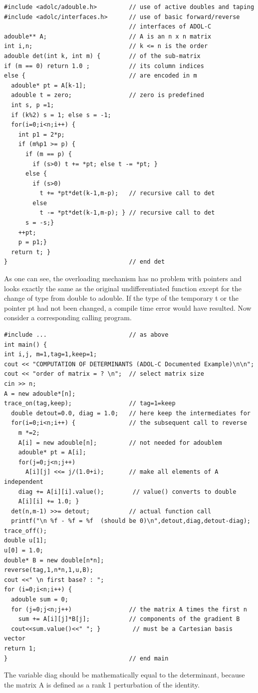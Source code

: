 \documentclass[11pt,twoside]{article}
\begin{document}
\begin{verbatim}
#include <adolc/adouble.h>         // use of active doubles and taping
#include <adolc/interfaces.h>      // use of basic forward/reverse
                                   // interfaces of ADOL-C
adouble** A;                       // A is an n x n matrix
int i,n;                           // k <= n is the order
adouble det(int k, int m) {        // of the sub-matrix
if (m == 0) return 1.0 ;           // its column indices
else {                             // are encoded in m
  adouble* pt = A[k-1];
  adouble t = zero;                // zero is predefined
  int s, p =1;
  if (k%2) s = 1; else s = -1;
  for(i=0;i<n;i++) {
    int p1 = 2*p;
    if (m%p1 >= p) {
      if (m == p) {
        if (s>0) t += *pt; else t -= *pt; }
      else {
        if (s>0)
          t += *pt*det(k-1,m-p);   // recursive call to det
        else
          t -= *pt*det(k-1,m-p); } // recursive call to det
      s = -s;}
    ++pt;
    p = p1;}
  return t; }
}                                  // end det
\end{verbatim}
As one can see, the overloading mechanism has no problem with pointers
and looks exactly the same as the original undifferentiated function
except for the change of type from {\sf double} to {\sf adouble}.
If the type of the temporary {\sf t} or the pointer {\sf pt} had not been changed,
a compile time error would have resulted. Now consider a corresponding
calling program.

\begin{verbatim}
#include ...                       // as above
int main() {
int i,j, m=1,tag=1,keep=1;
cout << "COMPUTATION OF DETERMINANTS (ADOL-C Documented Example)\n\n";
cout << "order of matrix = ? \n";  // select matrix size
cin >> n;
A = new adouble*[n];              
trace_on(tag,keep);                // tag=1=keep
  double detout=0.0, diag = 1.0;   // here keep the intermediates for
  for(i=0;i<n;i++) {               // the subsequent call to reverse
    m *=2;
    A[i] = new adouble[n];         // not needed for adoublem
    adouble* pt = A[i];
    for(j=0;j<n;j++)
      A[i][j] <<= j/(1.0+i);       // make all elements of A independent
    diag += A[i][i].value();        // value() converts to double
    A[i][i] += 1.0; }
  det(n,m-1) >>= detout;           // actual function call 
  printf("\n %f - %f = %f  (should be 0)\n",detout,diag,detout-diag);
trace_off();
double u[1];
u[0] = 1.0;
double* B = new double[n*n];
reverse(tag,1,n*n,1,u,B);
cout <<" \n first base? : ";
for (i=0;i<n;i++) {
  adouble sum = 0;
  for (j=0;j<n;j++)                // the matrix A times the first n
    sum += A[i][j]*B[j];           // components of the gradient B
  cout<<sum.value()<<" "; }         // must be a Cartesian basis vector
return 1;
}                                  // end main
\end{verbatim}
The variable {\sf diag} should be mathematically 
equal to the determinant, because the
matrix {\sf A} is defined as a rank 1 perturbation of the identity.
%
\end{document}
